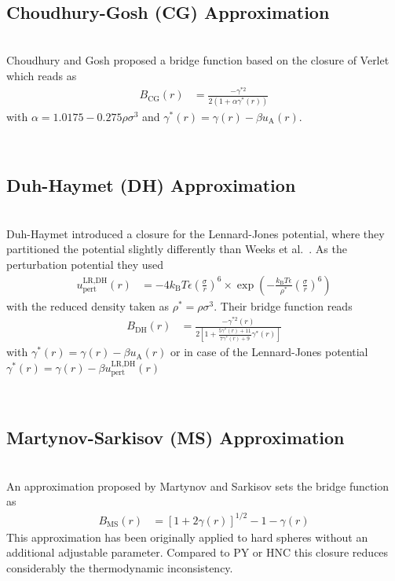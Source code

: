 \vphantom{.}~\\
\subsection{Choudhury-Gosh (CG) Approximation}
~\\

Choudhury and Gosh \cite{Choudhury2002} proposed a bridge function based on the closure of Verlet
which reads as
\begin{align}
B_\text{CG}(r) &=
\frac{-\gamma^{*2}}{2\left(1+\alpha\gamma^*(r)\right)}
\end{align}
with $\alpha=1.0175-0.275\rho\sigma^3$ and $\gamma^*(r)=\gamma(r)-\beta u_\text{A}(r)$.

~\\
\subsection{Duh-Haymet (DH) Approximation }
~\\

Duh-Haymet \cite{Duh1995} introduced a closure for the Lennard-Jones potential,
where they partitioned the potential slightly differently than Weeks et al.\ \cite{Weeks1971}.
As the perturbation potential they used
\begin{align}
u^\text{LR,DH}_\text{pert}(r) &= -4k_\text{B}T\epsilon\left(\frac{\sigma}{r}\right)^6
\times \exp \left( -\frac{k_\text{B}T\epsilon}{\rho^*} \left(\frac{\sigma}{r}\right)^6 \right)
\end{align}
with the reduced density taken as $\rho^*=\rho\sigma^3$. Their bridge function reads
\begin{align}
B_\text{DH}(r) &=
\frac{-\gamma^{*2}(r)}{2\left[1+\frac{5\gamma^*(r)+11}{7\gamma^*(r)+9}\gamma^*(r)\right]}
\end{align}
with $\gamma^*(r) = \gamma(r) - \beta u_\text{A}(r)$ or in case of the Lennard-Jones potential
$\gamma^*(r) = \gamma(r) - \beta u^\text{LR,DH}_\text{pert}(r)$


\vphantom{.}~\\
\subsection{Martynov-Sarkisov (MS) Approximation}
\label{sec:MS}~\\

An approximation proposed by Martynov and Sarkisov \cite{Martynov1983} sets the bridge function as
\begin{align}
B_\text{MS}(r) &= \left[1+2\gamma(r)\right]^{1/2}-1-\gamma(r)
\end{align}
This approximation has been originally applied to hard spheres without an additional adjustable parameter.
Compared to PY or HNC this closure reduces considerably the thermodynamic inconsistency.

